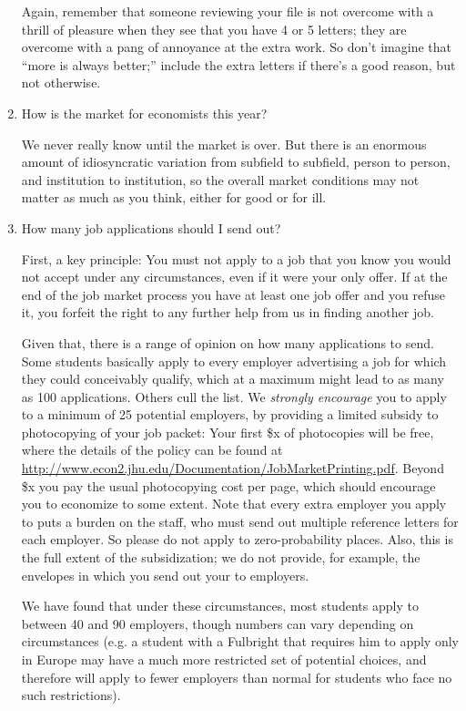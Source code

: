 \documentclass{econtex}
\begin{document}
\begin{enumerate}
Again, remember that someone reviewing your file is not overcome with
a thrill of pleasure when they see that you have 4 or 5 letters; they
are overcome with a pang of annoyance at the extra work.  So don't
imagine that ``more is always better;'' include the extra letters if
there's a good reason, but not otherwise.


\item How is the market for economists this year?

We never really know until the market is over.  But there is an enormous amount of idiosyncratic
variation from subfield to subfield, person to person, and institution to
institution, so the overall market conditions may not matter as much
as you think, either for good or for ill.

\item {} 
How many job applications should I send out?

First, a key principle: You must not apply to a job that you know you would not
accept under any circumstances, even if it were your only offer.  If
at the end of the job market process you have at least one job offer
and you refuse it, you forfeit the right to any further help from us
in finding another job.  %

Given that, there is a range of opinion on how many applications to
send.  Some students basically apply to every employer advertising a
job for which they could conceivably qualify, which at a maximum might 
lead to as many as 100 applications.  Others cull the list.  We {\it strongly
  encourage} you to apply to a minimum of 25 potential employers, by
providing a limited subsidy to photocopying of your job packet: Your
first \$x of photocopies will be free, where the details of the policy
can be found at
\url{http://www.econ2.jhu.edu/Documentation/JobMarketPrinting.pdf}.
Beyond \$x you pay the usual photocopying cost per page, which should
encourage you to economize to some extent.  Note that every extra
employer you apply to puts a burden on the staff, who must send out
multiple reference letters for each employer.  So please do not apply
to zero-probability places.  Also, this is the full extent of the
subsidization; we do not provide, for example, the envelopes in which
you send out your \Acorn to employers.

We have found that under these circumstances, most students apply to between 
40 and 90 employers, though numbers can vary depending on circumstances 
(e.g. a student with a Fulbright that requires him to apply only in 
Europe may have a much more restricted set of potential choices,
and therefore will apply to fewer employers than normal for students who face
no such restrictions).



\end{enumerate}
\end{document}
